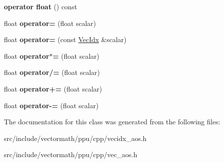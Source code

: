 \begin{DoxyCompactItemize}
\item 
\hypertarget{classVectormath_1_1Aos_1_1VecIdx_aecba0ac0fdaea640cb3c373eb21cfdda}{{\bfseries operator float} () const }\label{classVectormath_1_1Aos_1_1VecIdx_aecba0ac0fdaea640cb3c373eb21cfdda}

\item 
\hypertarget{classVectormath_1_1Aos_1_1VecIdx_a2900ce64010206c5eb676f6c9338adbd}{float {\bfseries operator=} (float scalar)}\label{classVectormath_1_1Aos_1_1VecIdx_a2900ce64010206c5eb676f6c9338adbd}

\item 
\hypertarget{classVectormath_1_1Aos_1_1VecIdx_afcd2bedac1ae7f5b7549accb77f3edbc}{float {\bfseries operator=} (const \hyperlink{classVectormath_1_1Aos_1_1VecIdx}{Vec\-Idx} \&scalar)}\label{classVectormath_1_1Aos_1_1VecIdx_afcd2bedac1ae7f5b7549accb77f3edbc}

\item 
\hypertarget{classVectormath_1_1Aos_1_1VecIdx_aac958ef606b0f2c185f3713bf5649ddc}{float {\bfseries operator$\ast$=} (float scalar)}\label{classVectormath_1_1Aos_1_1VecIdx_aac958ef606b0f2c185f3713bf5649ddc}

\item 
\hypertarget{classVectormath_1_1Aos_1_1VecIdx_a6f435d5924a565ec2a04949778d47ca6}{float {\bfseries operator/=} (float scalar)}\label{classVectormath_1_1Aos_1_1VecIdx_a6f435d5924a565ec2a04949778d47ca6}

\item 
\hypertarget{classVectormath_1_1Aos_1_1VecIdx_a9c2012ddcb1884faba437e6f8950ed7d}{float {\bfseries operator+=} (float scalar)}\label{classVectormath_1_1Aos_1_1VecIdx_a9c2012ddcb1884faba437e6f8950ed7d}

\item 
\hypertarget{classVectormath_1_1Aos_1_1VecIdx_a97233d2ad8b81b3741f8d59ac61d427d}{float {\bfseries operator-\/=} (float scalar)}\label{classVectormath_1_1Aos_1_1VecIdx_a97233d2ad8b81b3741f8d59ac61d427d}

\end{DoxyCompactItemize}


The documentation for this class was generated from the following files\-:\begin{DoxyCompactItemize}
\item 
src/include/vectormath/ppu/cpp/vecidx\-\_\-aos.\-h\item 
src/include/vectormath/ppu/cpp/vec\-\_\-aos.\-h\end{DoxyCompactItemize}

